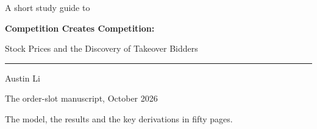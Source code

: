 \documentclass[11pt,a4paper,openany]{book}
\begin{document}
\frontmatter
\begin{titlepage}
\centering
\vspace*{0.22\textheight}
{\color{notegrey}\large A short study guide to\par}
\vspace{1.2em}
{\LARGE\bfseries Competition Creates Competition:\par}
\vspace{0.4em}
{\Large Stock Prices and the Discovery of Takeover Bidders\par}
\vspace{2.4em}
{\color{rulegrey}\rule{0.35\textwidth}{0.6pt}\par}
\vspace{1.6em}
{\large Austin Li\par}
\vspace{0.8em}
{\color{notegrey}The order-slot manuscript, October 2026\par}
\vfill
{\small\color{notegrey}The model, the results and the key derivations in fifty pages.\par}
\end{titlepage}

{\setlength{\parskip}{0pt}\setcounter{tocdepth}{0}\tableofcontents}

\mainmatter














\end{document}
